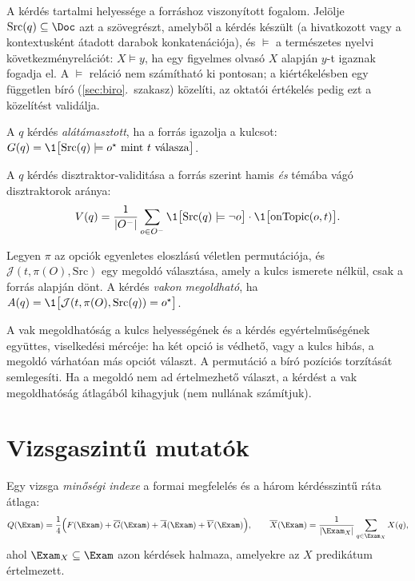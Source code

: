 A kérdés tartalmi helyessége a forráshoz viszonyított fogalom. Jelölje $\mathrm{Src}(q)\subseteq\Doc$
azt a szövegrészt, amelyből a kérdés készült (a hivatkozott vagy a kontextusként átadott darabok
konkatenációja), és $\models$ a természetes nyelvi következményrelációt: $X\models y$, ha egy
figyelmes olvasó $X$ alapján $y$-t igaznak fogadja el. A $\models$ reláció nem számítható ki pontosan;
a kiértékelésben egy független bíró (\ref{sec:biro}.~szakasz) közelíti, az oktatói értékelés pedig ezt
a közelítést validálja.

\begin{definicio}[Alátámasztottság]
A $q$ kérdés \emph{alátámasztott}, ha a forrás igazolja a kulcsot:
$G(q)=\1\bigl[\mathrm{Src}(q)\models o^{\star}\text{ mint } t \text{ válasza}\bigr]$.
\end{definicio}

\begin{definicio}
A $q$ kérdés disztraktor-validitása a forrás szerint hamis \emph{és} témába vágó disztraktorok aránya:
\begin{equation}
V(q)=\frac{1}{|O^{-}|}\sum_{o\in O^{-}}\1\bigl[\mathrm{Src}(q)\models\neg o\bigr]\cdot\1\bigl[\mathrm{onTopic}(o,t)\bigr].
\end{equation}
\end{definicio}

\begin{definicio}
Legyen $\pi$ az opciók egyenletes eloszlású véletlen permutációja, és $\mathcal{J}(t,\pi(O),\mathrm{Src})$
egy megoldó választása, amely a kulcs ismerete nélkül, csak a forrás alapján dönt. A kérdés \emph{vakon
megoldható}, ha $A(q)=\1\bigl[\mathcal{J}(t,\pi(O),\mathrm{Src}(q))=o^{\star}\bigr]$.
\end{definicio}

A vak megoldhatóság a kulcs helyességének és a kérdés egyértelműségének együttes, viselkedési mércéje:
ha két opció is védhető, vagy a kulcs hibás, a megoldó várhatóan más opciót választ. A permutáció a
bíró pozíciós torzítását~\cite{wang2024fair} semlegesíti. Ha a megoldó nem ad értelmezhető választ,
a kérdést a vak megoldhatóság átlagából kihagyjuk (nem nullának számítjuk).

\section{Vizsgaszintű mutatók}

\begin{definicio}
Egy vizsga \emph{minőségi indexe} a formai megfelelés és a három kérdésszintű ráta átlaga:
\begin{equation}
Q(\Exam)=\frac14\Bigl(F(\Exam)+\overline{G}(\Exam)+\overline{A}(\Exam)+\overline{V}(\Exam)\Bigr),
\qquad \overline{X}(\Exam)=\frac{1}{|\Exam_X|}\sum_{q\in\Exam_X}X(q),
\label{eq:qindex}
\end{equation}
ahol $\Exam_X\subseteq\Exam$ azon kérdések halmaza, amelyekre az $X$ predikátum értelmezett.
\end{definicio}


